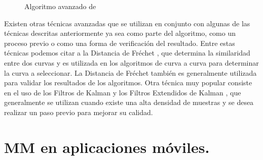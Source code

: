 \begin{figure}[h]
\centering
\begin{singlespace}
\end{singlespace}
\caption{Algoritmo avanzado de \citep{quddus2006high}}
\label{fig:algoritmo-avanzado} 
\end{figure}

Existen otras técnicas avanzadas que se utilizan en conjunto con algunas de las técnicas descritas anteriormente ya sea como parte del algoritmo, como un proceso previo o como una forma de verificación del resultado. Entre estas técnicas podemos citar a la Distancia de Fréchet \citep{chen2011approximate,eisner2011algorithms}, que determina la similaridad entre dos curvas y es utilizada en los algoritmos de curva a curva para determinar la curva a seleccionar. La Distancia de Fréchet también es generalmente utilizada para validar los resultados de los algoritmos. Otra técnica muy popular consiste en el uso de los Filtros de Kalman y los Filtros Extendidos de Kalman \citep{kim2001adaptive}, que generalmente se utilizan cuando existe una alta densidad de muestras y se desea realizar un paso previo para mejorar su calidad.

\section{MM en aplicaciones móviles.}

